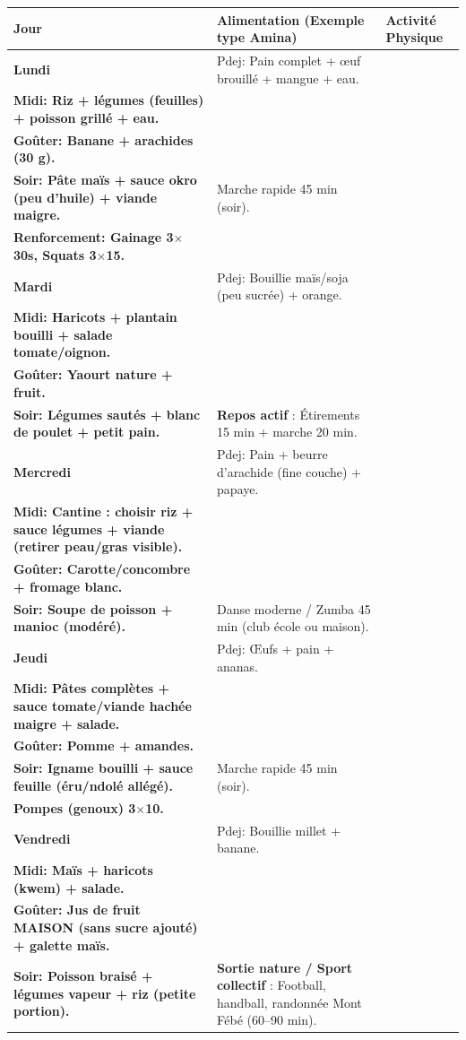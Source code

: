 \documentclass[11pt]{article}
\begin{document}
\begin{center}
\begin{tabularx}{\linewidth}{|>{\bfseries}l|X|X|}\hline
\textbf{Jour} & \textbf{Alimentation (Exemple type Amina)} & \textbf{Activité Physique} \\\hline
Lundi & Pdej: Pain complet + œuf brouillé + mangue + eau.\\
Midi: Riz + légumes (feuilles) + poisson grillé + eau.\\
Goûter: Banane + arachides (30 g).\\
Soir: Pâte maïs + sauce okro (peu d'huile) + viande maigre. & Marche rapide 45 min (soir).\\
Renforcement: Gainage 3$\times$30s, Squats 3$\times$15. \\\hline
Mardi & Pdej: Bouillie maïs/soja (peu sucrée) + orange.\\
Midi: Haricots + plantain bouilli + salade tomate/oignon.\\
Goûter: Yaourt nature + fruit.\\
Soir: Légumes sautés + blanc de poulet + petit pain. & \textbf{Repos actif} : Étirements 15 min + marche 20 min. \\\hline
Mercredi & Pdej: Pain + beurre d'arachide (fine couche) + papaye.\\
Midi: Cantine : choisir riz + sauce légumes + viande (retirer peau/gras visible).\\
Goûter: Carotte/concombre + fromage blanc.\\
Soir: Soupe de poisson + manioc (modéré). & Danse moderne / Zumba 45 min (club école ou maison). \\\hline
Jeudi & Pdej: Œufs + pain + ananas.\\
Midi: Pâtes complètes + sauce tomate/viande hachée maigre + salade.\\
Goûter: Pomme + amandes.\\
Soir: Igname bouilli + sauce feuille (éru/ndolé allégé). & Marche rapide 45 min (soir).\\
Pompes (genoux) 3$\times$10. \\\hline
Vendredi & Pdej: Bouillie millet + banane.\\
Midi: Maïs + haricots (kwem) + salade.\\
Goûter: Jus de fruit MAISON (sans sucre ajouté) + galette maïs.\\
Soir: Poisson braisé + légumes vapeur + riz (petite portion). & \textbf{Sortie nature / Sport collectif} : Football, handball, randonnée Mont Fébé (60--90 min). \\\hline

\end{tabularx}
\end{center}
\end{document}
